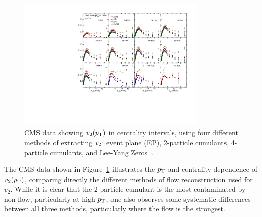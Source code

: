 \begin{figure}[!tb]
\begin{center}
\includegraphics[width=0.8\textwidth]{flowcorrelations_figs/v2_pt_12cen_4methods.pdf}
\caption[]{
CMS data showing $\mbox{$v_2$}(\mbox{$p_{\mathrm{T}}$})$ in centrality intervals, using four different methods of extracting
$\mbox{$v_2$}$: event plane (EP), 2-particle cumulants, 4-particle cumulants, and Lee-Yang Zeros~\cite{Chatrchyan:2012ta}.
}
\label{fig:pas:fc:methods}
\end{center}
\end{figure}

The CMS data shown in Figure~\ref{fig:pas:fc:methods} illustrates the $\mbox{$p_{\mathrm{T}}$}$ and centrality dependence of
$v_2(\mbox{$p_{\mathrm{T}}$})$, comparing directly the different methods of flow reconstruction used for $v_2$.
While it is clear that the 2-particle cumulant is the most contaminated by non-flow, particularly at high $\mbox{$p_{\mathrm{T}}$}$,
one also observes some systematic differences between all three methods, particularly where the flow
is the strongest.

